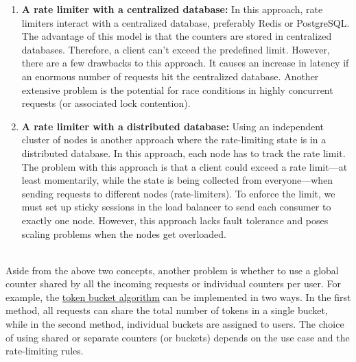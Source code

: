 \begin{enumerate}
\item
\protect{}\label{EXY1Hd2d7V_gAWs-PN-mZ}
\textbf{A rate limiter with a centralized database:} In this approach, rate limiters interact with a centralized database, preferably Redis or PostgreSQL. The advantage of this model is that the counters are stored in centralized databases. Therefore, a client can't exceed the predefined limit. However, there are a few drawbacks to this approach. It causes an increase in latency if an enormous number of requests hit the centralized database. Another extensive problem is the potential for race conditions in highly concurrent requests (or associated lock contention).
\item
\protect{}\label{TkBoBDGUoFy-UK3hWT0xS}
\textbf{A rate limiter with a distributed database:} Using an independent cluster of nodes is another approach where the rate-limiting state is in a distributed database. In this approach, each node has to track the rate limit. The problem with this approach is that a client could exceed a rate limit---at least momentarily, while the state is being collected from everyone---when sending requests to different nodes (rate-limiters). To enforce the limit, we must set up sticky sessions in the load balancer to send each consumer to exactly one node. However, this approach lacks fault tolerance and poses scaling problems when the nodes get overloaded.
\end{enumerate}
\\
Aside from the above two concepts, another problem is whether to use a global counter shared by all the incoming requests or individual counters per user. For example, the \href{https://www.educative.io/courses/grokking-the-system-design-interview/rate-limiter-algorithms\#Token-bucket-algorithm}{token bucket algorithm} can be implemented in two ways. In the first method, all requests can share the total number of tokens in a single bucket, while in the second method, individual buckets are assigned to users. The choice of using shared or separate counters (or buckets) depends on the use case and the rate-limiting rules.

